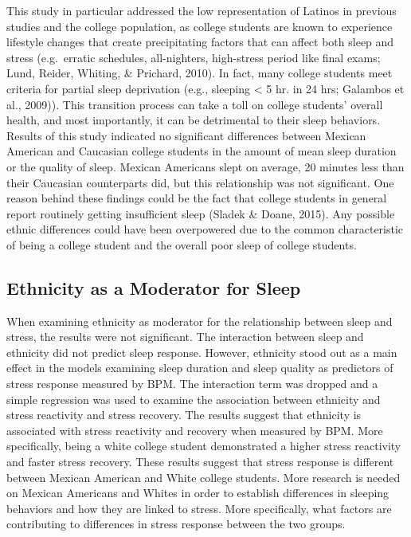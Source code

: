 \documentclass[
  man, fleqn, noextraspace]{apa6}
\begin{document}
This study in particular addressed the low representation of Latinos in previous studies and the college population, as college students are known to experience lifestyle changes that create precipitating factors that can affect both sleep and stress (e.g.~erratic schedules, all-nighters, high-stress period like final exams; Lund, Reider, Whiting, \& Prichard, 2010). In fact, many college students meet criteria for partial sleep deprivation (e.g., sleeping \textless{} 5 hr. in 24 hrs; Galambos et al., 2009)). This transition process can take a toll on college students' overall health, and most importantly, it can be detrimental to their sleep behaviors. Results of this study indicated no significant differences between Mexican American and Caucasian college students in the amount of mean sleep duration or the quality of sleep. Mexican Americans slept on average, 20 minutes less than their Caucasian counterparts did, but this relationship was not significant. One reason behind these findings could be the fact that college students in general report routinely getting insufficient sleep (Sladek \& Doane, 2015). Any possible ethnic differences could have been overpowered due to the common characteristic of being a college student and the overall poor sleep of college students.

\hypertarget{ethnicity-as-a-moderator-for-sleep}{%
\subsection{Ethnicity as a Moderator for Sleep}\label{ethnicity-as-a-moderator-for-sleep}}

When examining ethnicity as moderator for the relationship between sleep and stress, the results were not significant. The interaction between sleep and ethnicity did not predict sleep response. However, ethnicity stood out as a main effect in the models examining sleep duration and sleep quality as predictors of stress response measured by BPM. The interaction term was dropped and a simple regression was used to examine the association between ethnicity and stress reactivity and stress recovery. The results suggest that ethnicity is associated with stress reactivity and recovery when measured by BPM. More specifically, being a white college student demonstrated a higher stress reactivity and faster stress recovery. These results suggest that stress response is different between Mexican American and White college students. More research is needed on Mexican Americans and Whites in order to establish differences in sleeping behaviors and how they are linked to stress. More specifically, what factors are contributing to differences in stress response between the two groups.
\end{document}
